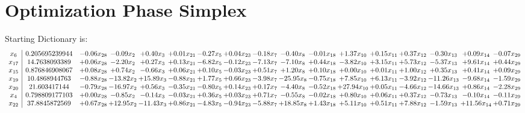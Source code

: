 \documentclass[9pt]{article}
\begin{document}
\section{Optimization Phase Simplex}
Starting Dictionary is:
\[\begin{array}{c| c c@{\hskip 2pt} c@{\hskip 2pt} c@{\hskip 2pt} c@{\hskip 2pt} c@{\hskip 2pt} c@{\hskip 2pt} c@{\hskip 2pt} c@{\hskip 2pt} c@{\hskip 2pt} c@{\hskip 2pt} c@{\hskip 2pt} c@{\hskip 2pt} c@{\hskip 2pt} c@{\hskip 2pt} c@{\hskip 2pt} }
 x_{6}   &  0.205695239944 & -0.06 x_{28} & -0.09 x_{2} & +  0.40 x_{3} & +  0.01 x_{21} & -0.27 x_{5} & +  0.04 x_{23} & -0.18 x_{7} & -0.40 x_{8} & -0.01 x_{18} & +  1.37 x_{10} & +  0.15 x_{11} & +  0.37 x_{12} & -0.30 x_{13} & +  0.09 x_{14} & -0.07 x_{29}\\
 x_{17}   &  14.7638093389 & +  0.06 x_{28} & -2.20 x_{2} & +  0.27 x_{3} & +  0.13 x_{21} & -6.82 x_{5} & -0.12 x_{23} & -7.13 x_{7} & -7.10 x_{8} & +  0.44 x_{18} & -3.82 x_{10} & +  3.15 x_{11} & +  5.73 x_{12} & -5.37 x_{13} & +  9.61 x_{14} & +  0.44 x_{29}\\
 x_{15}   &  0.876846908067 & +  0.08 x_{28} & +  0.74 x_{2} & -0.66 x_{3} & +  0.06 x_{21} & +  0.10 x_{5} & -0.03 x_{23} & +  0.51 x_{7} & +  1.20 x_{8} & +  0.10 x_{18} & +  0.00 x_{10} & +  0.01 x_{11} & +  1.00 x_{12} & +  0.35 x_{13} & +  0.41 x_{14} & +  0.09 x_{29}\\
 x_{19}   &  10.4868944763 & -0.88 x_{28} & -13.82 x_{2} & + 15.89 x_{3} & -0.88 x_{21} & +  1.77 x_{5} & +  0.66 x_{23} & -3.98 x_{7} & -25.95 x_{8} & -0.75 x_{18} & +  7.85 x_{10} & +  6.13 x_{11} & -3.92 x_{12} & -11.26 x_{13} & -9.68 x_{14} & -1.59 x_{29}\\
 x_{20}   &  21.603417144 & -0.79 x_{28} & -16.97 x_{2} & +  0.56 x_{3} & -0.35 x_{21} & -0.80 x_{5} & +  0.14 x_{23} & +  0.17 x_{7} & -4.40 x_{8} & -0.52 x_{18} & + 27.94 x_{10} & +  0.05 x_{11} & -4.66 x_{12} & -14.66 x_{13} & +  0.86 x_{14} & -2.28 x_{29}\\
 x_{4}   &  0.798809177103 & +  0.00 x_{28} & -0.85 x_{2} & -0.14 x_{3} & -0.03 x_{21} & +  0.36 x_{5} & +  0.03 x_{23} & +  0.71 x_{7} & -0.55 x_{8} & -0.02 x_{18} & +  0.80 x_{10} & +  0.06 x_{11} & +  0.37 x_{12} & -0.73 x_{13} & -0.10 x_{14} & -0.11 x_{29}\\
 x_{22}   &  37.8845872569 & +  0.67 x_{28} & + 12.95 x_{2} & -11.43 x_{3} & +  0.86 x_{21} & -4.83 x_{5} & -0.94 x_{23} & -5.88 x_{7} & + 18.85 x_{8} & +  1.43 x_{18} & +  5.11 x_{10} & +  0.51 x_{11} & +  7.88 x_{12} & -1.59 x_{13} & + 11.56 x_{14} & +  0.71 x_{29}\\

\end{array}\]
\end{document}

